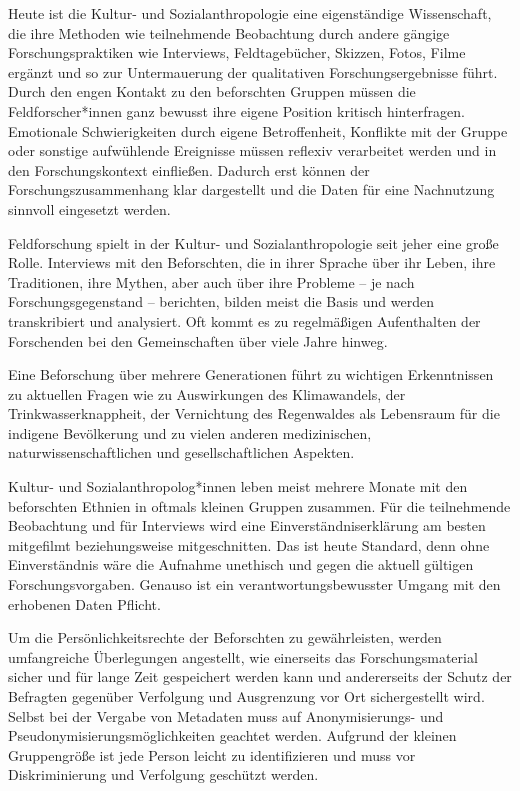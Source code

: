 \documentclass[a4paper,
fontsize=11pt,
oneside,
numbers=noperiodatend,
parskip=half-,
bibliography=totoc,
final
]{scrartcl}
\begin{document}
Heute ist die Kultur- und Sozialanthropologie eine eigenständige
Wissenschaft, die ihre Methoden wie teilnehmende Beobachtung durch
andere gängige Forschungspraktiken wie Interviews, Feldtagebücher,
Skizzen, Fotos, Filme ergänzt und so zur Untermauerung der qualitativen
Forschungsergebnisse führt. Durch den engen Kontakt zu den beforschten
Gruppen müssen die Feldforscher*innen ganz bewusst ihre eigene Position
kritisch hinterfragen. Emotionale Schwierigkeiten durch eigene
Betroffenheit, Konflikte mit der Gruppe oder sonstige aufwühlende
Ereignisse müssen reflexiv verarbeitet werden und in den
Forschungskontext einfließen. Dadurch erst können der
Forschungszusammenhang klar dargestellt und die Daten für eine
Nachnutzung sinnvoll eingesetzt werden.

Feldforschung spielt in der Kultur- und Sozialanthropologie seit jeher
eine große Rolle. Interviews mit den Beforschten, die in ihrer Sprache
über ihr Leben, ihre Traditionen, ihre Mythen, aber auch über ihre
Probleme -- je nach Forschungsgegenstand -- berichten, bilden meist die
Basis und werden transkribiert und analysiert. Oft kommt es zu
regelmäßigen Aufenthalten der Forschenden bei den Gemeinschaften über
viele Jahre hinweg.

Eine Beforschung über mehrere Generationen führt zu wichtigen
Erkenntnissen zu aktuellen Fragen wie zu Auswirkungen des Klimawandels,
der Trinkwasserknappheit, der Vernichtung des Regenwaldes als Lebensraum
für die indigene Bevölkerung und zu vielen anderen medizinischen,
naturwissenschaftlichen und gesellschaftlichen Aspekten.

Kultur- und Sozialanthropolog*innen leben meist mehrere Monate mit den
beforschten Ethnien in oftmals kleinen Gruppen zusammen. Für die
teilnehmende Beobachtung und für Interviews wird eine
Einverständniserklärung am besten mitgefilmt beziehungsweise
mitgeschnitten. Das ist heute Standard, denn ohne Einverständnis wäre
die Aufnahme unethisch und gegen die aktuell gültigen
Forschungsvorgaben. Genauso ist ein verantwortungsbewusster Umgang mit
den erhobenen Daten Pflicht.

Um die Persönlichkeitsrechte der Beforschten zu gewährleisten, werden
umfangreiche Überlegungen angestellt, wie einerseits das
Forschungsmaterial sicher und für lange Zeit gespeichert werden kann und
andererseits der Schutz der Befragten gegenüber Verfolgung und
Ausgrenzung vor Ort sichergestellt wird. Selbst bei der Vergabe von
Metadaten muss auf \linebreak Anonymisierungs- und Pseudonymisierungsmöglichkeiten
geachtet werden. Aufgrund der kleinen Gruppengröße ist jede Person
leicht zu identifizieren und muss vor Diskriminierung und Verfolgung
geschützt werden.
\end{document}
